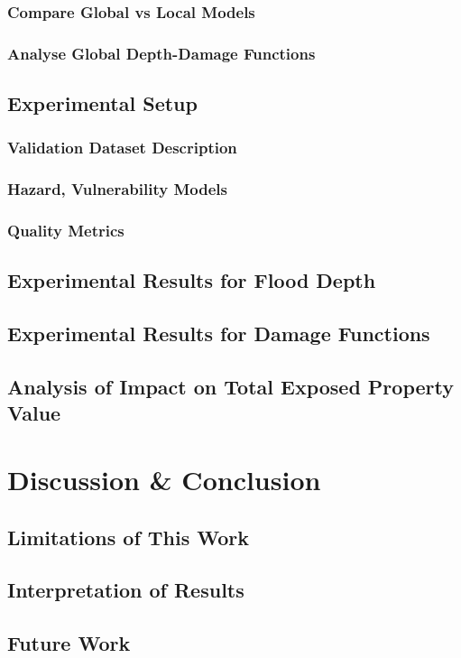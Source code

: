 \documentclass[a4paper,10.80pt,twoside]{article}
\begin{document}
\subsubsection{Compare Global vs Local Models}
\subsubsection{Analyse Global Depth-Damage Functions}
\subsection{Experimental Setup}
\subsubsection{Validation Dataset Description}
\subsubsection{Hazard, Vulnerability Models}
\subsubsection{Quality Metrics}
\subsection{Experimental Results for Flood Depth}
\subsection{Experimental Results for Damage Functions}
\subsection{Analysis of Impact on Total Exposed Property Value}

\section{Discussion \& Conclusion}
\subsection{Limitations of This Work}
\subsection{Interpretation of Results}
\subsection{Future Work}
\end{document}
